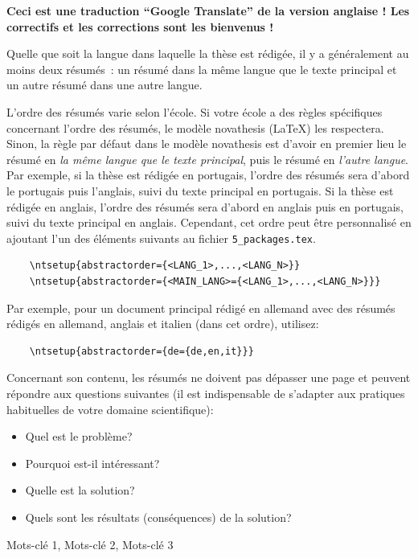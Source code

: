 
%

\textbf{Ceci est une traduction “Google Translate” de la version anglaise ! Les correctifs et les corrections sont les bienvenus !}

Quelle que soit la langue dans laquelle la thèse est rédigée, il y a généralement au moins deux résumés : un résumé dans la même langue que le texte principal et un autre résumé dans une autre langue.

L'ordre des résumés varie selon l'école. Si votre école a des règles spécifiques concernant l'ordre des résumés, le modèle \gls{novathesis} (\LaTeX) les respectera. Sinon, la règle par défaut dans le modèle \gls{novathesis} est d'avoir en premier lieu le résumé en \emph{la même langue que le texte principal}, puis le résumé en \emph{l'autre langue}. Par exemple, si la thèse est rédigée en portugais, l'ordre des résumés sera d'abord le portugais puis l'anglais, suivi du texte principal en portugais. Si la thèse est rédigée en anglais, l'ordre des résumés sera d'abord en anglais puis en portugais, suivi du texte principal en anglais.
%
Cependant, cet ordre peut être personnalisé en ajoutant l'un des éléments suivants au fichier \verb+5_packages.tex+.

\begin{verbatim}
    \ntsetup{abstractorder={<LANG_1>,...,<LANG_N>}}
    \ntsetup{abstractorder={<MAIN_LANG>={<LANG_1>,...,<LANG_N>}}}
\end{verbatim}

Par exemple, pour un document principal rédigé en allemand avec des résumés rédigés en allemand, anglais et italien (dans cet ordre), utilisez:
\begin{verbatim}
    \ntsetup{abstractorder={de={de,en,it}}}
\end{verbatim}

Concernant son contenu, les résumés ne doivent pas dépasser une page et peuvent répondre aux questions suivantes (il est indispensable de s'adapter aux pratiques habituelles de votre domaine scientifique):

\begin{itemize}
  \item Quel est le problème?
  \item Pourquoi est-il intéressant?
  \item Quelle est la solution?
  \item Quels sont les résultats (conséquences) de la solution?
\end{itemize}

\begin{keywords}
Mots-clé 1, Mots-clé 2, Mots-clé 3
\end{keywords}
